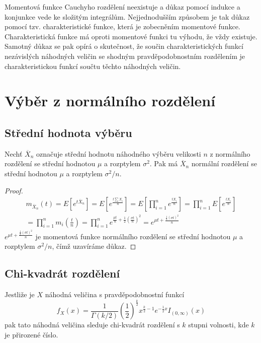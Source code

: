 Momentová funkce Cauchyho rozdělení neexistuje a důkaz pomocí indukce a konjunkce vede ke složitým integrálům. Nejjednodušším způsobem je tak důkaz pomocí tzv. charakteristické funkce, která je zobecněním momentové funkce. Charakteristická funkce má oproti momentové funkci tu výhodu, že vždy existuje. Samotný důkaz se pak opírá o skutečnost, že součin charakteristických funkcí nezávislých náhodných veličin se shodným pravděpodobnostním rozdělením je charakteristickou funkcí součtu těchto náhodných veličin.

\section{Výběr z normálního rozdělení}

\subsection{Střední hodnota výběru}

\begin{theorem}
Nechť $\overline{X}_n$ označuje střední hodnotu náhodného výběru velikosti $n$ z normálního rozdělení se střední hodnotou $\mu$ a rozptylem $\sigma^2$. Pak má $\overline{X}_n$ normální rozdělení se střední hodnotou $\mu$ a rozptylem $\sigma^2/n$.
\end{theorem}

\begin{proof}
\begin{gather*}
m_{\overline{X}_n}(t) = E[e^{t \overline{X}_n}] = E\left[e^{\frac{t \sum X_i}{n}} \right] = E\left[\prod_{i = 1}^n e^{\frac{t X_i}{n}} \right] = \prod_{i = 1}^n E\left[e^{\frac{t X_i}{n}} \right]\\
=\prod_{i = 1}^n m_i \left(\frac{t}{n}\right) = \prod_{i = 1}^n e^{\frac{\mu t}{n} + \frac{1}{2} \left(\frac{\sigma t}{n}\right)^2} = e^{\mu t + \frac{\frac{1}{2}(\sigma t)^2}{n}}
\end{gather*}
$e^{\mu t + \frac{\frac{1}{2}(\sigma t)^2}{n}}$ je momentová funkce normálního rozdělení se střední hodnotou $\mu$ a rozptylem $\sigma^2 / n$, čímž uzavíráme důkaz.
\end{proof}

\subsection{Chi-kvadrát rozdělení}

\begin{definition}
Jestliže je $X$ náhodná veličina s pravděpodobnostní funkcí
\begin{equation*}
f_X(x) = \frac{1}{\Gamma(k/2)} \left(\frac{1}{2}\right)^{\frac{k}{2}} x^{\frac{k}{2} - 1}e^{-\frac{1}{2}x}I_{(0, \infty)}(x) 
\end{equation*}
pak tato náhodná veličina sleduje chi-kvadrát rozdělení s $k$ stupni volnosti, kde $k$ je přirozené číslo.
\end{definition}

